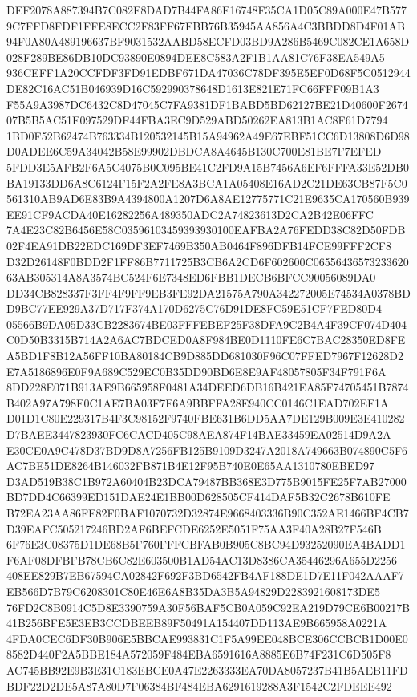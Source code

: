 \documentclass[UTF8,fontset=fandol,zihao=-4,a4paper]{ctexart}
\begin{document}
{{DEF2078A887394B7C082E8DAD7B44FA86E16748F35CA1D05C89A000E47B5779C7FFD8FDF1FFE8ECC2F83FF67FBB76B35945AA856A4C3BBDD8D4F01AB
94F0A80A489196637BF9031532AABD58ECFD03BD9A286B5469C082CE1A658D028F289BE86DB10DC93890E0894DEE8C583A2F1B1AA81C76F38EA549A5
936CEFF1A20CCFDF3FD91EDBF671DA47036C78DF395E5EF0D68F5C0512944DE82C16AC51B046939D16C592990378648D1613E821E71FC66FFF09B1A3
F55A9A3987DC6432C8D47045C7FA9381DF1BABD5BD62127BE21D40600F267407B5B5AC51E097529DF44FBA3EC9D529ABD50262EA813B1AC8F61D7794
1BD0F52B62474B763334B120532145B15A94962A49E67EBF51CC6D13808D6D98D0ADEE6C59A34042B58E99902DBDCA8A4645B130C700E81BE7F7EFED
5FDD3E5AFB2F6A5C4075B0C095BE41C2FD9A15B7456A6EF6FFFA33E52DB0BA19133DD6A8C6124F15F2A2FE8A3BCA1A05408E16AD2C21DE63CB87F5C0
561310AB9AD6E83B9A4394800A1207D6A8AE12775771C21E9635CA170560B939EE91CF9ACDA40E16282256A489350ADC2A74823613D2CA2B42E06FFC
7A4E23C82B6456E58C03596103459393930100EAFBA2A76FEDD38C82D50FDB02F4EA91DB22EDC169DF3EF7469B350AB0464F896DFB14FCE99FFF2CF8
D32D26148F0BDD2F1FF86B7711725B3CB6A2CD6F602600C0655643657323362063AB305314A8A3574BC524F6E7348ED6FBB1DECB6BFCC90056089DA0
DD34CB828337F3FF4F9FF9EB3FE92DA21575A790A342272005E74534A0378BDD9BC77EE929A37D717F374A170D6275C76D91DE8FC59E51CF7FED80D4
05566B9DA05D33CB2283674BE03FFFEBEF25F38DFA9C2B4A4F39CF074D404C0D50B3315B714A2A6AC7BDCED0A8F984BE0D1110FE6C7BAC28350ED8FE
A5BD1F8B12A56FF10BA80184CB9D885DD681030F96C07FFED7967F12628D2E7A5186896E0F9A689C529EC0B35DD90BD6E8E9AF48057805F34F791F6A
8DD228E071B913AE9B665958F0481A34DEED6DB16B421EA85F74705451B7874B402A97A798E0C1AE7BA03F7F6A9BBFFA28E940CC0146C1EAD702EF1A
D01D1C80E229317B4F3C98152F9740FBE631B6DD5AA7DE129B009E3E410282D7BAEE3447823930FC6CACD405C98AEA874F14BAE33459EA02514D9A2A
E30CE0A9C478D37BD9D8A7256FB125B9109D3247A2018A749663B074890C5F6AC7BE51DE8264B146032FB871B4E12F95B740E0E65AA1310780EBED97
D3AD519B38C1B972A60404B23DCA79487BB368E3D775B9015FE25F7AB27000BD7DD4C66399ED151DAE24E1BB00D628505CF414DAF5B32C2678B610FE
B72EA23AA86FE82F0BAF1070732D32874E9668403336B90C352AE1466BF4CB7D39EAFC505217246BD2AF6BEFCDE6252E5051F75AA3F40A28B27F546B
6F76E3C08375D1DE68B5F760FFFCBFAB0B905C8BC94D93252090EA4BADD1F6AF08DFBFB78CB6C82E603500B1AD54AC13D8386CA35446296A655D2256
408EE829B7EB67594CA02842F692F3BD6542FB4AF188DE1D7E11F042AAAF7EB566D7B79C6208301C80E46E6A8B35DA3B5A94829D2283921608173DE5
76FD2C8B0914C5D8E3390759A30F56BAF5CB0A059C92EA219D79CE6B00217B41B256BFE5E3EB3CCDBEEB89F50491A154407DD113AE9B665958A0221A
4FDA0CEC6DF30B906E5BBCAE993831C1F5A99EE048BCE306CCBCB1D00E08582D440F2A5BBE184A572059F484EBA6591616A8885E6B74F231C6D505F8
AC745BB92E9B3E31C183EBCE0A47E2263333EA70DA8057237B41B5AEB11FDBDF22D2DE5A87A80D7F06384BF484EBA6291619288A3F1542C2FDEEE492
}}
\end{document}
